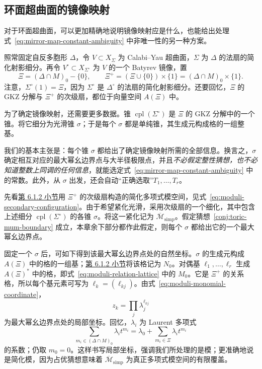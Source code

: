 \subsection{环面超曲面的镜像映射}\label{subsec:toric-mirror-map}
对于环面超曲面，可以更加精确地说明镜像映射应是什么，也能给出处理式~\eqref{eq:mirror-map-constant-ambiguity} 中非唯一性的另一种方案。

照常固定自反多胞形 $\Delta$，令 $V\subset X_\Sigma$ 为 Calabi--Yau 超曲面，$\Sigma$ 为 $\Delta$ 的法扇的简化射影细分。再令 $V^\circ\subset X_{\Sigma^\circ}$ 为 $V$ 的一个 Batyrev 镜像，置
\[
\Xi=(\Delta\cap M)_0-\{0\},\qquad
\Xi^+=(\Xi\cup\{0\})\times\{1\}=(\Delta\cap M)_0\times\{1\}.
\]
注意，$\Sigma^\circ(1)=\Xi$，因为 $\Sigma^\circ$ 是 $\Delta^\circ$ 的法扇的简化射影细分。还要回忆，$\Xi$ 的 GKZ 分解与 $\Xi^+$ 的次级扇，都位于向量空间 $A(\Xi)$ 中。

为了确定镜像映射，还需要更多数据。锥 $\operatorname{cpl}(\Sigma^\circ)$ 是 $\Xi$ 的 GKZ 分解中的一个锥。将它细分为光滑锥 $\sigma$；于是每个 $\sigma$ 都是单纯锥，其生成元构成格的一组整基。

我们的基本主张是：每个锥 $\sigma$ 都给出了确定镜像映射所需的全部信息。换言之，$\sigma$ 确定相互对应的最大幂幺边界点与大半径极限点，并且\emph{不必假定整性猜想，也不必知道整数上同调的任何信息}，就能选定式~\eqref{eq:mirror-map-constant-ambiguity} 中的常数。此外，从 $\sigma$ 出发，还会自动“正确选取”$T_1,\ldots,T_r$。

先看\hyperref[subsec:toric-complex-moduli]{第 6.1.2 小节}用 $\Xi^+$ 的次级扇构造的简化多项式模空间，见式~\eqref{eq:moduli-secondary-configuration}。由于希望紧化光滑，采用次级扇的一个细化，其中包含上述细分 $\operatorname{cpl}(\Sigma^\circ)$ 的各锥 $\sigma$。将这一紧化记为 $\overline{\mathcal M}_{\mathrm{simp}}$。假定猜想~\ref{conj:toric-mum-boundary} 成立，本章余下部分都作此假定，则每个 $\sigma$ 都给出它的一个最大幂幺边界点。

固定一个 $\sigma$ 后，可如下得到该最大幂幺边界点处的自然坐标。$\sigma$ 的生成元构成 $A(\Xi)$ 中的格的一组基；\hyperref[subsec:toric-complex-moduli]{第 6.1.2 小节}将该格记为 $N_0$。对偶基 $\ell_1,\ldots,\ell_r$ 生成 $A(\Xi)^*$ 中的格，即式~\eqref{eq:moduli-relation-lattice} 中的 $M_0$。它是 $\Xi^+$ 的关系格，所以每个基元素可写为 $\ell_k=(\ell_{kj})$。由式~\eqref{eq:moduli-monomial-coordinate}，
\begin{equation}\label{eq:toric-mirror-moduli-coordinates}
z_k=\prod_j\lambda_j^{\ell_{kj}}
\end{equation}
为最大幂幺边界点处的局部坐标。回忆，$\lambda_i$ 为 Laurent 多项式
\begin{equation}\label{eq:toric-mirror-laurent-polynomial}
\sum_{m_i\in(\Delta\cap M)_0}\lambda_i t^{m_i}
=\lambda_0+\sum_{m_i\in\Xi}\lambda_i t^{m_i}
\end{equation}
的系数；仍取 $m_0=0$。这样书写局部坐标，强调我们所处理的是模；更准确地说是简化模，因为占优猜想意味着 $\overline{\mathcal M}_{\mathrm{simp}}$ 为真正多项式模空间的有限覆盖。

